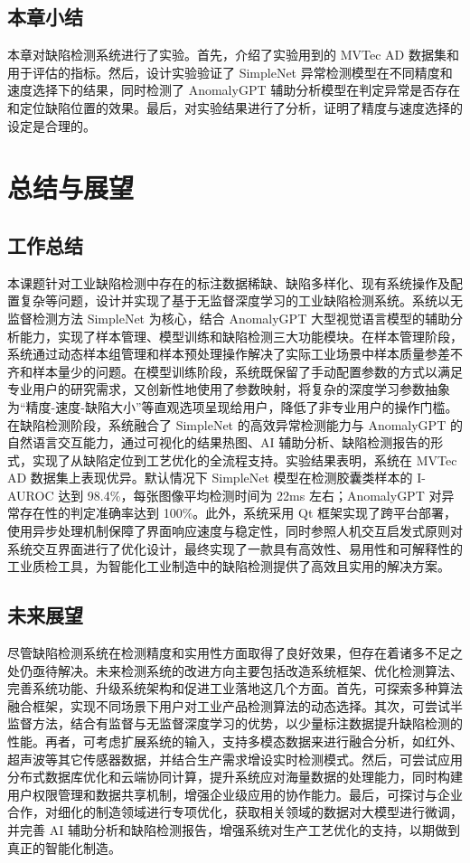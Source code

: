 \documentclass[
  ]{njuthesis}
\begin{document}
\section{本章小结}

本章对缺陷检测系统进行了实验。首先，介绍了实验用到的 MVTec AD 数据集和用于评估的指标。然后，设计实验验证了 SimpleNet 异常检测模型在不同精度和速度选择下的结果，同时检测了 AnomalyGPT 辅助分析模型在判定异常是否存在和定位缺陷位置的效果。最后，对实验结果进行了分析，证明了精度与速度选择的设定是合理的。

\chapter{总结与展望}

\section{工作总结}

本课题针对工业缺陷检测中存在的标注数据稀缺、缺陷多样化、现有系统操作及配置复杂等问题，设计并实现了基于无监督深度学习的工业缺陷检测系统。系统以无监督检测方法 SimpleNet 为核心，结合 AnomalyGPT 大型视觉语言模型的辅助分析能力，实现了样本管理、模型训练和缺陷检测三大功能模块。在样本管理阶段，系统通过动态样本组管理和样本预处理操作解决了实际工业场景中样本质量参差不齐和样本量少的问题。在模型训练阶段，系统既保留了手动配置参数的方式以满足专业用户的研究需求，又创新性地使用了参数映射，将复杂的深度学习参数抽象为“精度-速度-缺陷大小”等直观选项呈现给用户，降低了非专业用户的操作门槛。在缺陷检测阶段，系统融合了 SimpleNet 的高效异常检测能力与 AnomalyGPT 的自然语言交互能力，通过可视化的结果热图、AI 辅助分析、缺陷检测报告的形式，实现了从缺陷定位到工艺优化的全流程支持。实验结果表明，系统在 MVTec AD 数据集上表现优异。默认情况下 SimpleNet 模型在检测胶囊类样本的 I-AUROC 达到 98.4\%，每张图像平均检测时间为 22ms 左右；AnomalyGPT 对异常存在性的判定准确率达到 100\%。此外，系统采用 Qt 框架实现了跨平台部署，使用异步处理机制保障了界面响应速度与稳定性，同时参照人机交互启发式原则对系统交互界面进行了优化设计，最终实现了一款具有高效性、易用性和可解释性的工业质检工具，为智能化工业制造中的缺陷检测提供了高效且实用的解决方案。

\section{未来展望}

尽管缺陷检测系统在检测精度和实用性方面取得了良好效果，但存在着诸多不足之处仍亟待解决。未来检测系统的改进方向主要包括改造系统框架、优化检测算法、完善系统功能、升级系统架构和促进工业落地这几个方面。首先，可探索多种算法融合框架，实现不同场景下用户对工业产品检测算法的动态选择。其次，可尝试半监督方法，结合有监督与无监督深度学习的优势，以少量标注数据提升缺陷检测的性能。再者，可考虑扩展系统的输入，支持多模态数据来进行融合分析，如红外、超声波等其它传感器数据，并结合生产需求增设实时检测模式。然后，可尝试应用分布式数据库优化和云端协同计算，提升系统应对海量数据的处理能力，同时构建用户权限管理和数据共享机制，增强企业级应用的协作能力。最后，可探讨与企业合作，对细化的制造领域进行专项优化，获取相关领域的数据对大模型进行微调，并完善 AI 辅助分析和缺陷检测报告，增强系统对生产工艺优化的支持，以期做到真正的智能化制造。
\end{document}
